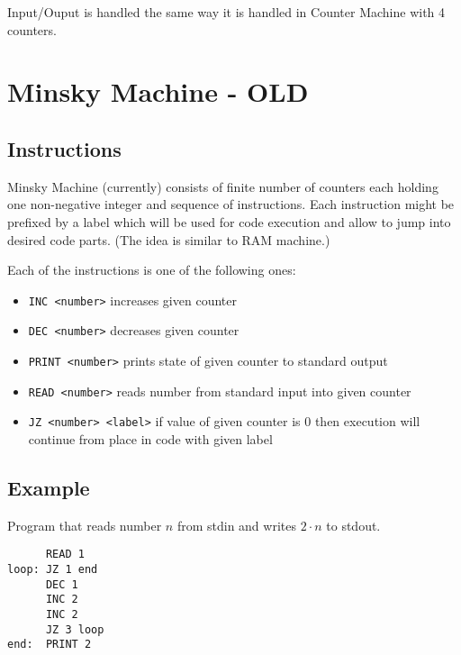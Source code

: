 \documentclass[english,shortabstract,mgr]{iithesis}
\begin{document}
Input/Ouput is handled the same way it is handled in Counter Machine with 4 counters.

\section {Minsky Machine - OLD}

\subsection {Instructions}
Minsky Machine (currently) consists of finite number of counters
each holding one non-negative integer and sequence of instructions.
Each instruction might be prefixed by a label which will be used for
code execution and allow to jump into desired code parts. (The idea is similar
to RAM machine.)

Each of the instructions is one of the following ones:
\begin{itemize}
  \item \texttt{INC <number>} increases given counter
  \item \texttt{DEC <number>} decreases given counter
  \item \texttt{PRINT <number>} prints state of given counter to standard output
  \item \texttt{READ <number>} reads number from standard input into given counter
  \item \texttt{JZ <number> <label>} if value of given counter is 0 then execution
        will continue from place in code with given label
\end{itemize}

\subsection {Example}
Program that reads number $n$ from stdin and writes $2 \cdot n$ to stdout.

\begin{verbatim}
      READ 1
loop: JZ 1 end
      DEC 1
      INC 2
      INC 2
      JZ 3 loop
end:  PRINT 2
\end{verbatim}


\end{document}
